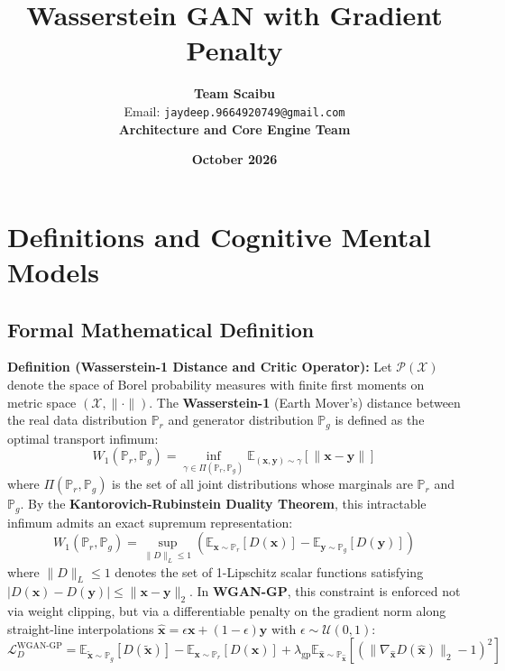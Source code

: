\documentclass[11pt,a4paper]{article}
\title{\textbf{Wasserstein GAN with Gradient Penalty}}
\author{\textbf{Team Scaibu} \\ \small Email: \texttt{jaydeep.9664920749@gmail.com} \\ \small \textbf{Architecture and Core Engine Team}}
\date{\textbf{October 2026}}
\theoremstyle{definition}
\begin{document}
\maketitle

\section{Definitions and Cognitive Mental Models}

\subsection{Formal Mathematical Definition}
\textbf{Definition (Wasserstein-1 Distance and Critic Operator):}
Let $\mathcal{P}(\mathcal{X})$ denote the space of Borel probability measures with finite first moments on metric space $(\mathcal{X}, \|\cdot\|)$. The \textbf{Wasserstein-1} (Earth Mover's) distance between the real data distribution $\mathbb{P}_r$ and generator distribution $\mathbb{P}_g$ is defined as the optimal transport infimum:
{\boldmath
\begin{equation}
W_1(\mathbb{P}_r, \mathbb{P}_g) = \inf_{\gamma \in \Pi(\mathbb{P}_r, \mathbb{P}_g)} \mathbb{E}_{(\mathbf{x}, \mathbf{y}) \sim \gamma}[\|\mathbf{x} - \mathbf{y}\|]
\end{equation}
}
where $\Pi(\mathbb{P}_r, \mathbb{P}_g)$ is the set of all joint distributions whose marginals are $\mathbb{P}_r$ and $\mathbb{P}_g$. By the \textbf{Kantorovich-Rubinstein Duality Theorem}, this intractable infimum admits an exact supremum representation:
{\boldmath
\begin{equation}
W_1(\mathbb{P}_r, \mathbb{P}_g) = \sup_{\|D\|_L \le 1} \left( \mathbb{E}_{\mathbf{x} \sim \mathbb{P}_r}[D(\mathbf{x})] - \mathbb{E}_{\mathbf{y} \sim \mathbb{P}_g}[D(\mathbf{y})] \right)
\end{equation}
}
where $\|D\|_L \le 1$ denotes the set of 1-Lipschitz scalar functions satisfying $|D(\mathbf{x}) - D(\mathbf{y})| \le \|\mathbf{x} - \mathbf{y}\|_2$. In \textbf{WGAN-GP}, this constraint is enforced not via weight clipping, but via a differentiable penalty on the gradient norm along straight-line interpolations $\hat{\mathbf{x}} = \epsilon \mathbf{x} + (1 - \epsilon)\mathbf{y}$ with $\epsilon \sim \mathcal{U}(0, 1)$:
{\boldmath
\begin{equation}
\mathcal{L}_D^{\text{WGAN-GP}} = \mathbb{E}_{\tilde{\mathbf{x}} \sim \mathbb{P}_g}[D(\tilde{\mathbf{x}})] - \mathbb{E}_{\mathbf{x} \sim \mathbb{P}_r}[D(\mathbf{x})] + \lambda_{\text{gp}} \mathbb{E}_{\hat{\mathbf{x}} \sim \mathbb{P}_{\hat{\mathbf{x}}}} \left[ (\|\nabla_{\hat{\mathbf{x}}} D(\hat{\mathbf{x}})\|_2 - 1)^2 \right]
\end{equation}
}
\end{document}
